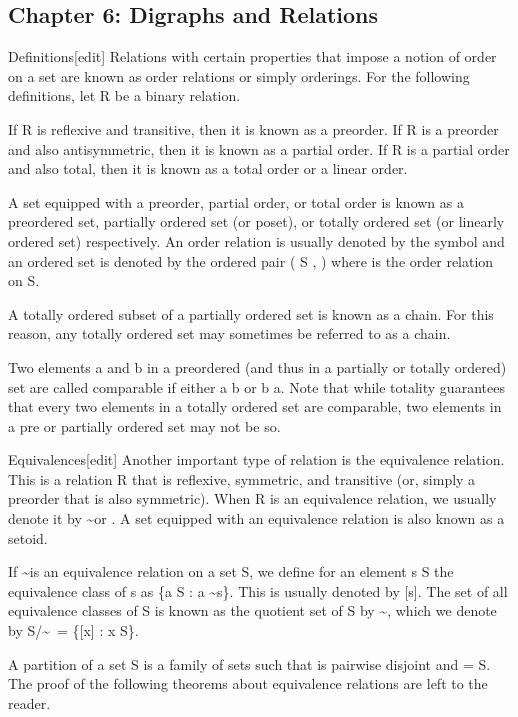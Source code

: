 \documentclass[]{article}
\begin{document}
\subsection*{Chapter 6: Digraphs and Relations}

Definitions[edit]
Relations with certain properties that impose a notion of order on a set are known as order relations or simply orderings. For the following definitions, let R be a binary relation.

If R is reflexive and transitive, then it is known as a preorder.
If R is a preorder and also antisymmetric, then it is known as a partial order.
If R is a partial order and also total, then it is known as a total order or a linear order.

A set equipped with a preorder, partial order, or total order is known as a preordered set, partially ordered set (or poset), or totally ordered set (or linearly ordered set) respectively. An order relation is usually denoted by the symbol \le and an ordered set is denoted by the ordered pair ( S , \le ) where \le is the order relation on S.

A totally ordered subset of a partially ordered set is known as a chain. For this reason, any totally ordered set may sometimes be referred to as a chain.

Two elements a and b in a preordered (and thus in a partially or totally ordered) set are called comparable if either a \le b or b \le a. Note that while totality guarantees that every two elements in a totally ordered set are comparable, two elements in a pre or partially ordered set may not be so.

Equivalences[edit]
Another important type of relation is the equivalence relation. This is a relation R that is reflexive, symmetric, and transitive (or, simply a preorder that is also symmetric). When R is an equivalence relation, we usually denote it by \sim or \equiv. A set equipped with an equivalence relation is also known as a setoid.

If \sim is an equivalence relation on a set S, we define for an element s \in S the equivalence class of s as \{a \in S : a \sim s\}. This is usually denoted by [s]. The set of all equivalence classes of S is known as the quotient set of S by \sim, which we denote by S/\!\sim\ = \{[x] : x \in S\}.

A partition of a set S is a family of sets  such that  is pairwise disjoint and \bigcup {} = S. The proof of the following theorems about equivalence relations are left to the reader.
\end{document}
